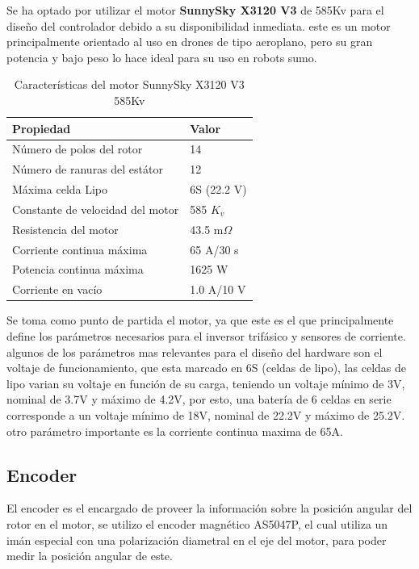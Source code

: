 \documentclass[11pt]{report}
\begin{document}
Se ha optado por utilizar el motor \textbf{SunnySky X3120 V3} de 585Kv para el diseño del controlador debido a su disponibilidad inmediata. este es un motor principalmente orientado al uso en drones de tipo aeroplano, pero su gran potencia y bajo peso lo hace ideal para su uso en robots sumo.

\begin{table}[h!]
	\centering
	\caption{Características del motor SunnySky X3120 V3 585Kv}
	\begin{tabular}{l l}
		\hline
		\textbf{Propiedad}               & \textbf{Valor} \\
		\hline
		Número de polos del rotor        & 14             \\
		Número de ranuras del estátor    & 12             \\
		Máxima celda Lipo                & 6S (22.2 V)    \\
		Constante de velocidad del motor & 585 $K_v$      \\
		Resistencia del motor            & 43.5 m$\Omega$ \\
		Corriente continua máxima        & 65 A/30 s      \\
		Potencia continua máxima         & 1625 W         \\
		Corriente en vacío               & 1.0 A/10 V     \\
		\hline
	\end{tabular}
\end{table}
\FloatBarrier

Se toma como punto de partida el motor, ya que este es el que principalmente define los parámetros necesarios para el inversor trifásico y sensores de corriente. algunos de los parámetros mas relevantes para el diseño del hardware son el voltaje de funcionamiento, que esta marcado en 6S (celdas de lipo), las celdas de lipo varian su voltaje en función de su carga, teniendo un voltaje mínimo de 3V, nominal de 3.7V y máximo de 4.2V, por esto, una batería de 6 celdas en serie corresponde a un voltaje mínimo de 18V, nominal de 22.2V y máximo de 25.2V. otro parámetro importante es la corriente continua maxima de 65A.

\newpage
\subsection{Encoder}

El encoder es el encargado de proveer la información sobre la posición angular del rotor en el motor, se utilizo el encoder magnético AS5047P, el cual utiliza un imán especial con una polarización diametral en el eje del motor, para poder medir la posición angular de este.
\end{document}
